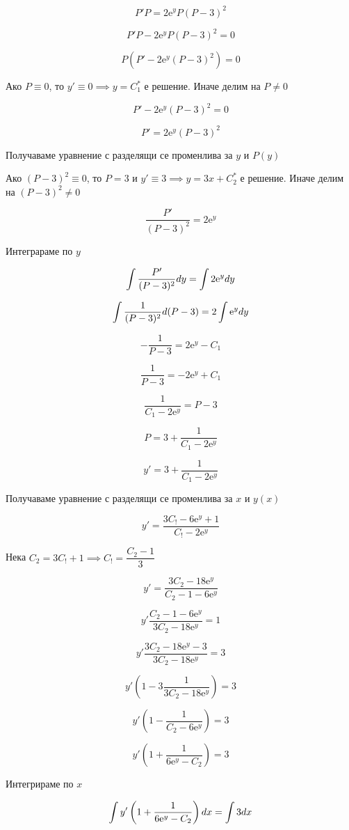 \documentclass{scrartcl}
\begin{document}
$$P'P = 2\mathrm{e}^yP(P-3)^2$$

$$P'P - 2\mathrm{e}^yP(P-3)^2 = 0$$

$$P(P' - 2\mathrm{e}^y(P-3)^2) = 0$$

Ако $P\equiv 0$, то $y' \equiv 0\implies y = C_1^*$ е решение. Иначе делим на $P\ne 0$

$$P' - 2\mathrm{e}^y(P-3)^2 = 0$$

$$P' = 2\mathrm{e}^y(P-3)^2$$

Получаваме уравнение с разделящи се променлива за $y$ и $P(y)$

Ако $(P-3)^2\equiv 0$, то $P=3$ и $y' \equiv 3\implies y = 3x+C_2^*$ е решение. Иначе делим на $(P-3)^2\ne 0$

$$\dfrac{P'}{(P-3)^2} = 2\mathrm{e}^y$$

Интеграраме по $y$

$$\displaystyle \int \dfrac{P'}{(P-3)^2}\space dy = \int 2\mathrm{e}^y \space dy$$

$$\displaystyle \int \dfrac{1}{(P-3)^2}\space d(P-3) = 2 \int \mathrm{e}^y \space dy$$

$$-\dfrac{1}{P-3} = 2\mathrm{e}^y - C_1$$

$$\dfrac{1}{P-3} = -2\mathrm{e}^y + C_1$$

$$\dfrac{1}{C_1-2\mathrm{e}^y} = P-3$$

$$P = 3 + \dfrac{1}{C_1-2\mathrm{e}^y}$$

$$y' = 3 + \dfrac{1}{C_1-2\mathrm{e}^y}$$

Получаваме уравнение с разделящи се променлива за $x$ и $y(x)$

$$y' = \dfrac{3C_!-6\mathrm{e}^y+1}{C_!-2\mathrm{e}^y}$$

Нека $C_2 = 3C_!+1 \implies C_! = \dfrac{C_2-1}{3}$

$$y' = \dfrac{3C_2-18\mathrm{e}^y}{C_2-1-6\mathrm{e}^y}$$

$$y'\dfrac{C_2-1-6\mathrm{e}^y}{3C_2-18\mathrm{e}^y} = 1$$

$$y'\dfrac{3C_2-18\mathrm{e}^y-3}{3C_2-18\mathrm{e}^y} = 3$$

$$y'\left(1-3\dfrac{1}{3C_2-18\mathrm{e}^y}\right) = 3$$

$$y'\left(1-\dfrac{1}{C_2-6\mathrm{e}^y}\right) = 3$$

$$y'\left(1+\dfrac{1}{6\mathrm{e}^y-C_2}\right) = 3$$

Интегрираме по $x$

$$\displaystyle \int y'\left(1+\dfrac{1}{6\mathrm{e}^y-C_2}\right)\space dx = \int 3\space dx$$
\end{document}
